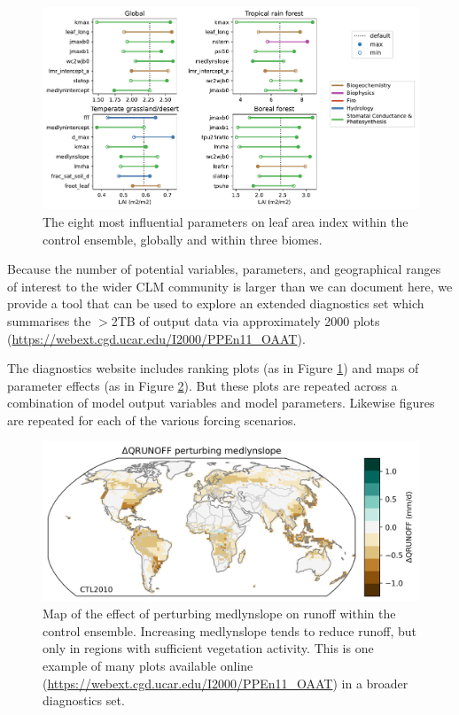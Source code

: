 \documentclass[draft]{agujournal2019}
\begin{document}
\begin{figure}[h]
\centering
\includegraphics[width=\textwidth]{../figs/lai_biome.pdf}
\caption{The eight most influential parameters on leaf area index within the control ensemble, globally and within three biomes.}
\label{fig:lai}
\end{figure}

Because the number of potential variables, parameters, and geographical ranges of interest to the wider CLM community is larger than we can document here,  we provide a tool that can be used to explore an extended diagnostics set which summarises the $>$2TB of output data via approximately 2000 plots (\url{https://webext.cgd.ucar.edu/I2000/PPEn11_OAAT}). 

The diagnostics website includes ranking plots (as in Figure \ref{fig:lai}) and maps of parameter effects (as in Figure \ref{fig:panel}). But these plots are repeated across a combination of model output variables and model parameters. Likewise figures are repeated for each of the various forcing scenarios. 

\begin{figure}[h]
\centering
\includegraphics[width=\textwidth]{../figs/QRUNOFFabs_x_medlynslope_CTL2010.png}
\caption{Map of the effect of perturbing medlynslope on runoff within the control ensemble. Increasing medlynslope tends to reduce runoff, but only in regions with sufficient vegetation activity. This is one example of many plots available online (\url{https://webext.cgd.ucar.edu/I2000/PPEn11_OAAT}) in a broader diagnostics set. }
\label{fig:panel}
\end{figure}
\end{document}
